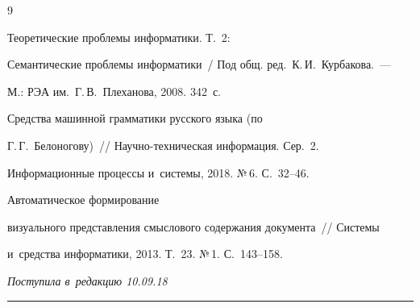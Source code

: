 {\small\frenchspacing

{%


\begin{thebibliography}{9}


 Теоретические проблемы информатики. Т.~2: 

Семантические проблемы информатики~/ Под общ. ред.\ К.\,И.~Курбакова.~--- 

М.: РЭА им.\ Г.\,В.~Плеханова, 2008. 342~с.


 Средства машинной грамматики русского языка (по 

Г.\,Г.~Белоногову)~/\!\!/ На\-уч\-но-тех\-ни\-че\-ская информация. Сер.~2. 

Информационные процессы и~системы, 2018. №\,6. С.~32--46.


 Автоматическое формирование 

визуального представления смыслового содержания документа~/\!\!/ Системы 

и~средства информатики, 2013. Т.~23. №\,1. С.~143--158.

        \end{thebibliography}

} }





\vspace*{-3pt}



\hfill{\small\textit{Поступила в~редакцию 10.09.18}}









\vspace*{8pt}



\hrule



\vspace*{2pt}






